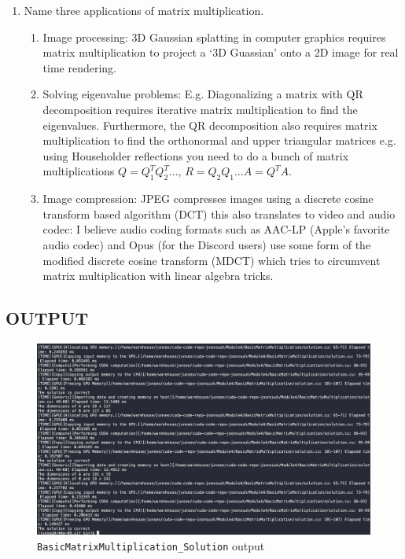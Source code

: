 \documentclass[../main.tex]{subfiles}
\begin{document}
\begin{enumerate}
    \item Name three applications of matrix multiplication.
    
    \begin{enumerate}
        \item Image processing: 3D Gaussian splatting in computer graphics requires 
        matrix multiplication to project a `3D Guassian' onto a 2D image for real time rendering.

        \item Solving eigenvalue problems: E.g. Diagonalizing a matrix with QR decomposition requires
        iterative matrix multiplication to find the eigenvalues. Furthermore, the QR decomposition
        also requires matrix multiplication to find the orthonormal and upper triangular matrices
        e.g. using Householder reflections you need to do a bunch of matrix multiplications
        $Q = Q_1^T Q_2^T \dots$, $R = Q_2 Q_1 \dots A = Q^T A$.

        \item Image compression: JPEG compresses images using a discrete cosine transform based
        algorithm (DCT) this also translates to video and audio codec: I believe audio coding
        formats such as AAC-LP (Apple's favorite audio codec) and Opus (for the Discord users)
        use some form of the modified discrete cosine transform (MDCT) which tries to circumvent
        matrix multiplication with linear algebra tricks.
    \end{enumerate}
\end{enumerate}

\newpage
\subsection*{OUTPUT}
\begin{figure}
    [ht]
    \centering
    \includegraphics[width=\textwidth]{basicMatrixMult.png}
    \caption{\texttt{BasicMatrixMultiplication\_Solution} output}
\end{figure}
\end{document}

